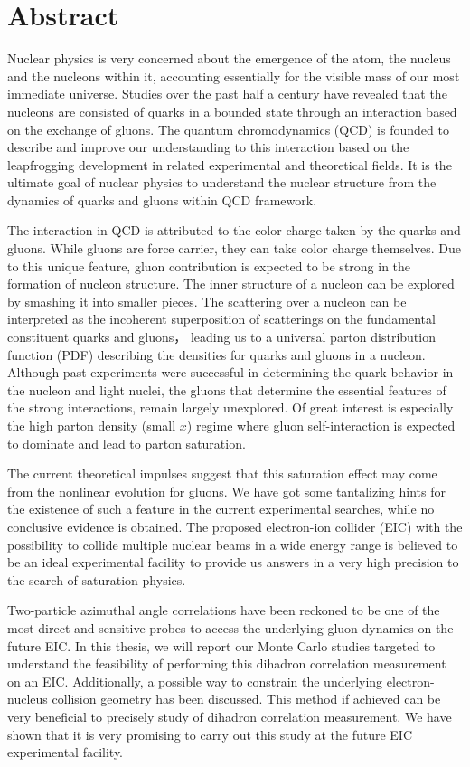 \chapter*{\LARGE \bfseries {Abstract}}

\normalsize { 

Nuclear physics is very concerned about the emergence of the atom, the nucleus
and the nucleons within it, accounting essentially for the visible mass of our
most immediate universe. Studies over the past half a century have revealed that
the nucleons are consisted of quarks in a bounded state through an interaction
based on the exchange of gluons. The quantum chromodynamics (QCD) is founded to
describe and improve our understanding to this interaction based on the
leapfrogging development in related experimental and theoretical fields. It is
the ultimate goal of nuclear physics to understand the nuclear structure from
the dynamics of quarks and gluons within QCD framework.

The interaction in QCD is attributed to the color charge taken by the quarks
and gluons. While gluons are force carrier, they can take color charge themselves.
Due to this unique feature, gluon contribution is expected to be strong in the
formation of nucleon structure. The inner structure of a nucleon can be explored
by smashing it into smaller pieces. The scattering over a nucleon can be interpreted
as the incoherent superposition of scatterings on the fundamental constituent
quarks and gluons， leading us to a universal parton distribution function (PDF)
describing the densities for quarks and gluons in a nucleon. Although past
experiments were successful in determining the quark behavior in the nucleon and
light nuclei, the gluons that determine the essential features of the strong
interactions, remain largely unexplored. Of great interest is especially the
high parton density (small $x$) regime where gluon self-interaction is expected to
dominate and lead to parton saturation. 

The current theoretical impulses suggest that this saturation effect may come
from the nonlinear evolution for gluons. We have got some tantalizing hints
for the existence of such a feature in the current experimental searches, while
no conclusive evidence is obtained. The proposed electron-ion collider (EIC) with
the possibility to collide multiple nuclear beams in a wide energy range is
believed to be an ideal experimental facility to provide us answers in a very high
precision to the search of saturation physics.

Two-particle azimuthal angle correlations have been reckoned to be one of the
most direct and sensitive probes to access the underlying gluon dynamics on the
future EIC. In this thesis, we will report our Monte Carlo studies targeted to
understand the feasibility of performing this dihadron correlation measurement
on an EIC. Additionally, a possible way to constrain the underlying
electron-nucleus collision geometry has been discussed. This method if achieved
can be very beneficial to precisely study of dihadron correlation measurement.
We have shown that it is very promising to carry out this study at the future
EIC experimental facility.



}
